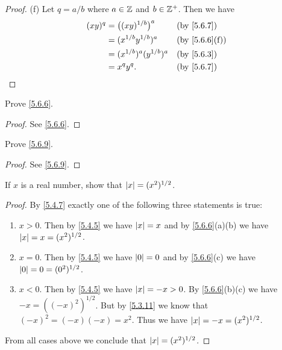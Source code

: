 \begin{proof}{(f)}
  Let \(q = a / b\) where \(a \in \mathbb{Z}\) and \(b \in \mathbb{Z}^+\).
  Then we have
  \begin{align*}
    (xy)^q & = \big((xy)^{1 / b}\big)^a    &  & \by{5.6.7}                  \\
           & = (x^{1 / b} y^{1 / b})^a     &  & \text{(by \cref{5.6.6}(f))} \\
           & = (x^{1 / b})^a (y^{1 / b})^a &  & \by{5.6.3}                  \\
           & = x^q y^q.                    &  & \by{5.6.7}
  \end{align*}
\end{proof}

\exercisesection

\begin{ex}\label{ex:5.6.1}
  Prove \cref{5.6.6}.
\end{ex}

\begin{proof}
  See \cref{5.6.6}.
\end{proof}

\begin{ex}\label{ex:5.6.2}
  Prove \cref{5.6.9}.
\end{ex}

\begin{proof}
  See \cref{5.6.9}.
\end{proof}

\begin{ex}\label{ex:5.6.3}
  If \(x\) is a real number, show that \(\left\lvert x\right\rvert = (x^2)^{1 / 2}\).
\end{ex}

\begin{proof}
  By \cref{5.4.7} exactly one of the following three statements is true:
  \begin{enumerate}
    \item \(x > 0\).
          Then by \cref{5.4.5} we have \(\left\lvert x\right\rvert = x\) and by \cref{5.6.6}(a)(b) we have \(\left\lvert x\right\rvert = x = (x^2)^{1 / 2}\).
    \item \(x = 0\).
          Then by \cref{5.4.5} we have \(\left\lvert0\right\rvert = 0\) and by \cref{5.6.6}(c) we have \(\left\lvert0\right\rvert = 0 = (0^2)^{1 / 2}\).
    \item \(x < 0\).
          Then by \cref{5.4.5} we have \(\left\lvert x\right\rvert = -x > 0\).
          By \cref{5.6.6}(b)(c) we have \(-x = ((-x)^2)^{1 / 2}\).
          But by \cref{5.3.11} we know that \((-x)^2 = (-x)(-x) = x^2\).
          Thus we have \(\left\lvert x\right\rvert = -x = (x^2)^{1 / 2}\).
  \end{enumerate}
  From all cases above we conclude that \(\left\lvert x\right\rvert = (x^2)^{1 / 2}\).
\end{proof}